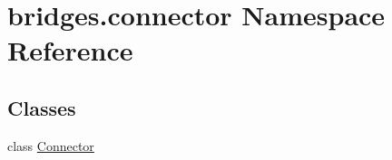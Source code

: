 \hypertarget{namespacebridges_1_1connector}{}\section{bridges.\+connector Namespace Reference}
\label{namespacebridges_1_1connector}
\subsection*{Classes}
\begin{DoxyCompactItemize}
\item 
class \hyperlink{classbridges_1_1connector_1_1_connector}{Connector}
\end{DoxyCompactItemize}
